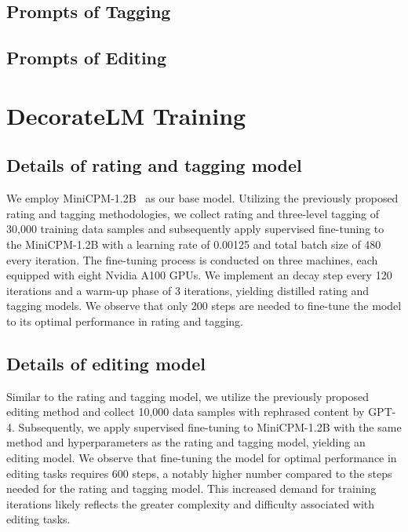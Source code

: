 \documentclass[11pt]{article}
\begin{document}
\subsection{Prompts of Tagging}
\label{tagging prompt}


\subsection{Prompts of Editing}
\label{editing prompt}


\section{DecorateLM Training}
\subsection{Details of rating and tagging model}
\label{decoratelm training details rt}
We employ MiniCPM-1.2B~\citep{hu2024minicpm} as our base model. Utilizing the previously proposed rating and tagging methodologies, we collect rating and three-level tagging of 30,000 training data samples and subsequently apply supervised fine-tuning to the MiniCPM-1.2B with a learning rate of 0.00125 and total batch size of 480 every iteration. The fine-tuning process is conducted on three machines, each equipped with eight Nvidia A100 GPUs. We implement an decay step every 120 iterations and a warm-up phase of 3 iterations, yielding distilled rating and tagging models. We observe that only 200 steps are needed to fine-tune the model to its optimal performance in rating and tagging.


\subsection{Details of editing model}
\label{decoratelm training details re}
Similar to the rating and tagging model, we utilize the previously proposed editing method and collect 10,000 data samples with rephrased content by GPT-4. Subsequently, we apply supervised fine-tuning to MiniCPM-1.2B with the same method and hyperparameters as the rating and tagging model, yielding an editing model. We observe that fine-tuning the model for optimal performance in editing tasks requires 600 steps, a notably higher number compared to the steps needed for the rating and tagging model. This increased demand for training iterations likely reflects the greater complexity and difficulty associated with editing tasks.
\end{document}
